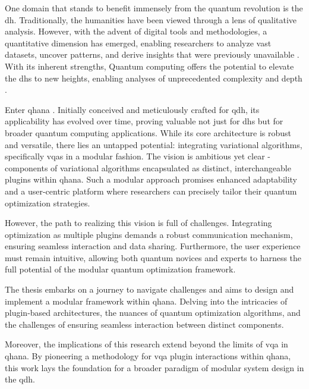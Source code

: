 \documentclass[
  a4paper,  %
  twoside,  %
  bibliography=totoc,
  headsepline,
  cleardoublepage=empty,
  parskip=half,
  draft=false
]{scrbook}
\begin{document}
One domain that stands to benefit immensely from the quantum revolution is the \gls{dh}.
Traditionally, the humanities have been viewed through a lens of qualitative analysis.
However, with the advent of digital tools and methodologies, a quantitative dimension has emerged, enabling researchers to analyze vast datasets, uncover patterns, and derive insights that were previously unavailable \cite{Barzen2019}.
With its inherent strengths, Quantum computing offers the potential to elevate the \glspl{dh} to new heights, enabling analyses of unprecedented complexity and depth \cite{Barzen2022}.

Enter \gls{qhana} \cite{Buehler2022}.
Initially conceived and meticulously crafted for \gls{qdh}, its applicability has evolved over time, proving valuable not just for \glspl{dh} but for broader quantum computing applications.
While its core architecture is robust and versatile, there lies an untapped potential: integrating variational algorithms, specifically \glspl{vqa} in a modular fashion.
The vision is ambitious yet clear - components of variational algorithms encapsulated as distinct, interchangeable plugins within \gls{qhana}.
Such a modular approach promises enhanced adaptability and a user-centric platform where researchers can precisely tailor their quantum optimization strategies.

However, the path to realizing this vision is full of challenges.
Integrating optimization as multiple plugins demands a robust communication mechanism, ensuring seamless interaction and data sharing.
Furthermore, the user experience must remain intuitive, allowing both quantum novices and experts to harness the full potential of the modular quantum optimization framework.

The thesis embarks on a journey to navigate challenges and aims to design and implement a modular framework within \gls{qhana}. Delving into the intricacies of plugin-based architectures, the nuances of quantum optimization algorithms, and the challenges of ensuring seamless interaction between distinct components.

Moreover, the implications of this research extend beyond the limits of \gls{vqa} in \gls{qhana}.
By pioneering a methodology for \gls{vqa} plugin interactions within \gls{qhana}, this work lays the foundation for a broader paradigm of modular system design in the \gls{qdh}.
\end{document}

